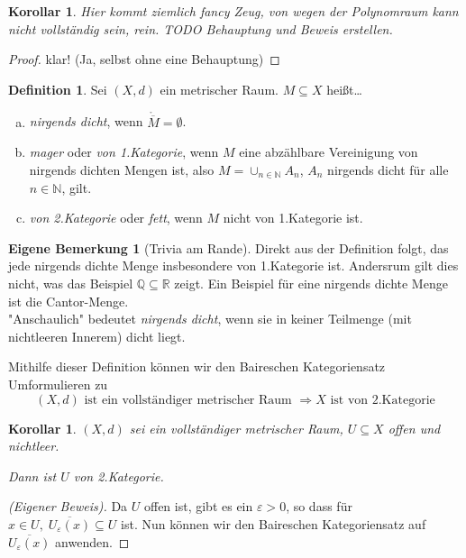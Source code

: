 \documentclass[ngerman]{report}
\theoremstyle{plain}%
\newtheorem{cor}[thm]{Korollar}
\newtheorem*{cor*}{Korollar}
\theoremstyle{definition}%
\newtheorem{definition}[thm]{Definition}
\theoremstyle{myStyle}
\newtheorem*{mbem*}{Eigene Bemerkung}
\newcommand{\R}{\mathbb{R}}
\newcommand{\Q}{\mathbb{Q}}
\newcommand{\N}{\mathbb{N}}
\newcommand{\df}[1][]{%
	\overset{#1}{\Rightarrow}
}
\newcommand{\qmarks}[1]{"#1"}
\begin{document}
	\begin{cor*}
		Hier kommt ziemlich fancy Zeug, von wegen der Polynomraum kann nicht vollständig sein, rein. TODO Behauptung und Beweis erstellen.
	\end{cor*}
	\begin{proof}
		klar! (Ja, selbst ohne eine Behauptung)
	\end{proof}

\begin{definition}
	Sei $(X,d)$ ein metrischer Raum. $M\subseteq X$ heißt\dots
	\begin{enumerate}[(a)]
		\item \textit{nirgends dicht}, wenn $\mathring{\overline{M}} = \emptyset$.
		
		\item \textit{mager} oder \textit{von 1.Kategorie}, wenn $M$ eine abzählbare Vereinigung von nirgends dichten Mengen ist, also $M = \cup_{n\in\N} A_n$, $A_n$ nirgends dicht für alle $n\in\N$, gilt.
		
		\item \textit{von 2.Kategorie }oder\textit{ fett}, wenn $M$ nicht von 1.Kategorie ist.
	\end{enumerate}
\end{definition}\par\bigskip

\begin{mbem*}[Trivia am Rande] Direkt aus der Definition folgt, das jede nirgends dichte Menge insbesondere von 1.Kategorie ist. Andersrum gilt dies nicht, was das Beispiel $\Q\subseteq \R$ zeigt. Ein Beispiel für eine nirgends dichte Menge ist die Cantor-Menge.\\
	 \qmarks{Anschaulich} bedeutet \textit{nirgends dicht}, wenn sie in keiner Teilmenge (mit nichtleeren Innerem) dicht liegt. \par\bigskip
\end{mbem*}
	Mithilfe dieser Definition können wir den Baireschen Kategoriensatz Umformulieren zu $$(X,d) \text{ ist ein vollständiger metrischer Raum } \df X \text{ ist von 2.Kategorie}$$ 

\begin{cor}
	$(X,d)$ sei ein vollständiger metrischer Raum, $U\subseteq X$ offen und nichtleer.\par
	Dann ist $U$ von 2.Kategorie.
\end{cor} 
\begin{proof}[(Eigener Beweis)]%
	Da $U$ offen ist, gibt es ein $\varepsilon>0$, so dass für $x\in U,\;\overline{U_\varepsilon(x)}\subseteq U$ ist. Nun können wir den Baireschen Kategoriensatz auf $\overline{U_\varepsilon(x)}$ anwenden.
\end{proof}
\end{document}
